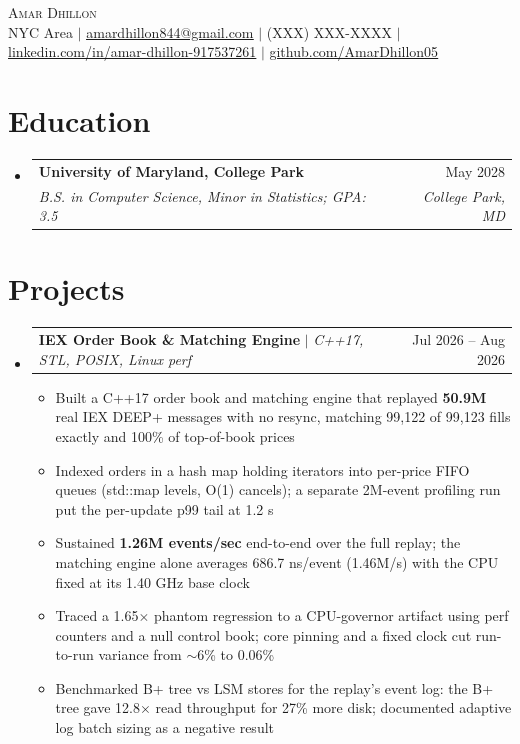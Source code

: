 \documentclass[letterpaper,10pt]{article}
\makeatletter
\newcommand{\resumeItem}[1]{\item{#1}\vspace{-1pt}}
\newcommand{\resumeSubheading}[4]{%
  \vspace{-1pt}\item
  \begin{tabular*}{\textwidth}[t]{l@{\extracolsep{\fill}}r}
    \textbf{#1} & #2 \\
    \textit{#3} & \textit{#4} \\
  \end{tabular*}\vspace{-6pt}%
}
\newcommand{\resumeProjectHeading}[2]{%
  \item
  \begin{tabular*}{\textwidth}{l@{\extracolsep{\fill}}r}
    #1 & #2 \\
  \end{tabular*}\vspace{-6pt}%
}
\newcommand{\resumeSubHeadingListStart}{\begin{itemize}[leftmargin=0in, label={}, itemsep=0pt, topsep=2pt]}
\newcommand{\resumeSubHeadingListEnd}{\end{itemize}}
\newcommand{\resumeItemListStart}{\begin{itemize}[leftmargin=0.18in, itemsep=0pt, topsep=1pt, parsep=0pt]}
\newcommand{\resumeItemListEnd}{\end{itemize}\vspace{0pt}}
\makeatother
\begin{document}
\begin{center}
  {\Huge\scshape\textcolor{accent}{Amar Dhillon}} \\ \vspace{3pt}
  \footnotesize
  NYC Area $|$
  \href{mailto:amardhillon844@gmail.com}{\underline{amardhillon844@gmail.com}} $|$
  (XXX) XXX-XXXX $|$
  \href{https://linkedin.com/in/amar-dhillon-917537261}{\underline{linkedin.com/in/amar-dhillon-917537261}} $|$
  \href{https://github.com/AmarDhillon05}{\underline{github.com/AmarDhillon05}}
\end{center}
\vspace{-6pt}

\section{Education}
\resumeSubHeadingListStart
  \resumeSubheading
    {University of Maryland, College Park}{May 2028}
    {B.S. in Computer Science, Minor in Statistics; GPA: 3.5}{College Park, MD}
\resumeSubHeadingListEnd

\section{Projects}
\resumeSubHeadingListStart
  \resumeProjectHeading
    {\textbf{IEX Order Book \& Matching Engine} $|$ \textit{C++17, STL, POSIX, Linux perf}}{Jul 2026 -- Aug 2026}
  \resumeItemListStart
    \resumeItem{Built a C++17 order book and matching engine that replayed \textbf{50.9M} real IEX DEEP+ messages with no resync, matching 99,122 of 99,123 fills exactly and 100\% of top-of-book prices}
    \resumeItem{Indexed orders in a hash map holding iterators into per-price FIFO queues (std::map levels, O(1) cancels); a separate 2M-event profiling run put the per-update p99 tail at 1.2 \textmu{}s}
    \resumeItem{Sustained \textbf{1.26M events/sec} end-to-end over the full replay; the matching engine alone averages 686.7 ns/event (1.46M/s) with the CPU fixed at its 1.40 GHz base clock}
    \resumeItem{Traced a 1.65$\times$ phantom regression to a CPU-governor artifact using perf counters and a null control book; core pinning and a fixed clock cut run-to-run variance from $\sim$6\% to 0.06\%}
    \resumeItem{Benchmarked B+ tree vs LSM stores for the replay's event log: the B+ tree gave 12.8$\times$ read throughput for 27\% more disk; documented adaptive log batch sizing as a negative result}
  \resumeItemListEnd
\resumeSubHeadingListEnd
\end{document}
